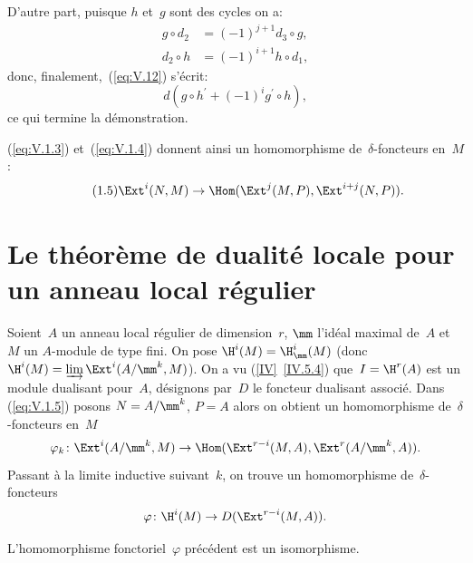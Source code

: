 D'autre part, puisque $h$ et~$g$ sont des cycles on a:
\begin{align*}
g\circ d_{2} &= (-1)^{j+1}d_{3}\circ g, \\
d_{2}\circ h &= (-1)^{i+1}h\circ d_{1},
\end{align*}
donc, finalement,~(\ref{eq:V.12}) s'\'ecrit:
$$d(g\circ h^{\prime}+(-1)^{i}g^{\prime}\circ h),
$$
ce qui termine la d\'emonstration.

(\ref{eq:V.1.3}) et~(\ref{eq:V.1.4}) donnent ainsi un homomorphisme de~$\delta$-foncteurs en~$M$:
\begin{equation*} \label{eq:V.1.5} \tag{1.5} \Ext^{i}(N, M)\to\Hom(\Ext^{j}(M, P), \Ext^{i+j}(N, P)).
\end{equation*}

\section{Le th\'eor\`eme de dualit\'e locale pour un anneau local r\'egulier} \label{V.2}

\setcounter{equation}{12}

Soient~$A$ un anneau local r\'egulier de dimension~$r$, $\mm$ l'id\'eal maximal de~$A$ et~$M$ un $A$-module de type fini. \label{pV2.4}On pose $\H^{i}(M)=\H^{i}_{\mm}(M)$ (donc $\H^{i}(M)=\varinjlim\Ext^{i}(A/\mm^{k}, M)$). On a vu (\ref{IV}~\ref{IV.5.4}) que~$I=\H^{r}(A)$ est un module dualisant pour~$A$, d\'esignons par~$D$ le foncteur dualisant associ\'e. Dans (\ref{eq:V.1.5}) posons $N=A/\mm^{k}$, $P=A$ alors on obtient un homomorphisme de~$\delta$-foncteurs en~$M$
\begin{equation} \label{eq:V.13} \varphi_{k}\colon\Ext^{i}(A/\mm^{k}, M)\to\Hom(\Ext^{r-i}(M, A), \Ext^{r}(A/\mm^{k}, A)).
\end{equation}
Passant \`a la limite inductive suivant~$k$, on trouve un homomorphisme de~$\delta$-foncteurs
\begin{equation} \label{eq:V.14} \varphi\colon\H^{i}(M)\to D(\Ext^{r-i}(M, A)).
\end{equation}

\begin{theoreme} \label{V.2.1}
L'homomorphisme fonctoriel~$\varphi$ pr\'ec\'edent est un isomorphisme.
\end{theoreme}

